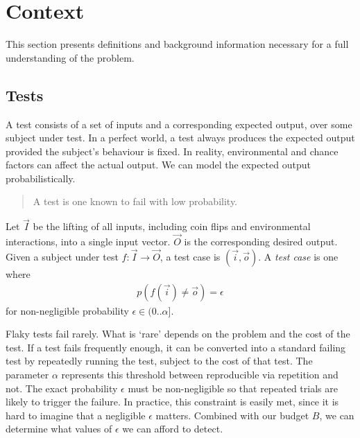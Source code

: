\section{Context}
\label{sec:context}

This section presents definitions and background information necessary for a
full understanding of the problem.


\subsection{\Flaky Tests}
\label{sec:sec:flaky_tests}

A test consists of a set of inputs and a corresponding expected output, over
some subject under test. In a perfect world, a test always produces the expected
output provided the subject's behaviour is fixed. In reality, environmental and
chance factors can affect the actual output. We can model the expected output
probabilistically.

\begin{quote}
	A \flaky test is one known to fail with low probability.
\end{quote}

\begin{defn}
\label{def:flaky_test}

Let $\vec{I}$ be the lifting of all inputs, including coin flips and
environmental interactions, into a single input vector. $\vec{O}$ is the
corresponding desired output. Given a subject under test $f: \vec{I} \rightarrow
\vec{O}$, a test case is $(\vec{i},\vec{o})$. A \emph{\flaky test case} is one
where
%
\begin{align*}
  p(f(\vec{i}) \ne \vec{o}) = \epsilon
\end{align*}
%
for non-negligible probability $\epsilon \in (0..\alpha]$.

\end{defn}

Flaky tests fail rarely.  What is {\lq}rare{\rq} depends on the problem and the
cost of the test.  If a test fails frequently enough, it can be converted into a
standard failing test by repeatedly running the test, subject to the cost of
that test.  The parameter $\alpha$ represents this threshold between
reproducible via repetition and not.  The exact probability $\epsilon$ must be
non-negligible so that repeated trials are likely to trigger the failure.  In
practice, this constraint is easily met, since it is hard to imagine that a
negligible $\epsilon$ matters.  Combined with our budget $B$, we can determine
what values of $\epsilon$ we can afford to detect.

